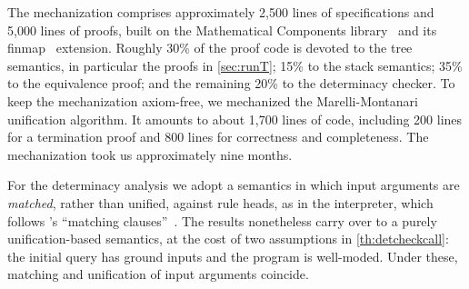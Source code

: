 \documentclass[sigplan,10pt,anonymous,review]{acmart}
\begin{document}
The mechanization comprises approximately 2,500 lines of
specifications and 5,000 lines of \ssreflect{} proofs, built on the
Mathematical Components library~\cite{assia_mahboubi_2022_7118596} and
its finmap~\cite{finmap} extension. Roughly 30\% of the proof code is
devoted to the tree semantics, in particular the proofs in
\cref{sec:runT}; 15\% to the stack semantics; 35\% to the equivalence
proof; and the remaining 20\% to the determinacy checker. 
To keep the mechanization axiom-free, we mechanized the Marelli-Montanari
unification algorithm. It amounts to about 1,700 lines of
\ssreflect{} code, including 200 lines for a termination proof
and 800 lines for correctness and
completeness.
The
mechanization took us approximately nine months. 

For the determinacy analysis we adopt a semantics in which input arguments are
\emph{matched}, rather than unified, against rule heads, as in the \elpiP
interpreter, which follows \bprologP's ``matching
clauses''~\cite{1991ait-wam,zhou2012}. The results nonetheless carry over to a
purely unification-based semantics, at the cost of two assumptions in
\cref{th:detcheckcall}: the initial query has ground inputs and the program is
well-moded. Under these, matching and unification of input arguments coincide.

\end{document}
